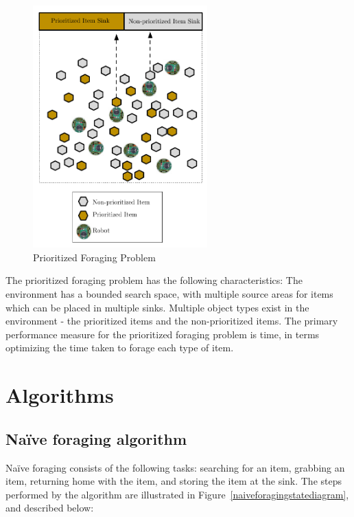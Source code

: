 \documentclass[preprint,12pt]{elsarticle}
\begin{document}
\begin{figure} [h]
	\centering
	\includegraphics[width=0.6\textwidth]{figures/EpuckGoldMining2.pdf}
	\caption{Prioritized Foraging Problem}
	\label{prioritizedforaging}
\end{figure}

The prioritized foraging problem has the following characteristics: The environment has a bounded search space, with multiple source areas for items which can be placed in multiple sinks. Multiple object types exist in the environment - the prioritized items and the non-prioritized items. The primary  performance measure for the prioritized foraging problem is time, in terms optimizing the time taken to forage each type of item. 


\section{Algorithms}
\label{algorithms}


\subsection{Na\"ive foraging algorithm}
\label{naiveforaging}

Na\"ive foraging consists of the following tasks: searching for an item, grabbing an item, returning home with the item, and storing the item at the sink. The steps performed by the algorithm are illustrated in Figure~\ref{naiveforagingstatediagram}, and described below:  
\end{document}

